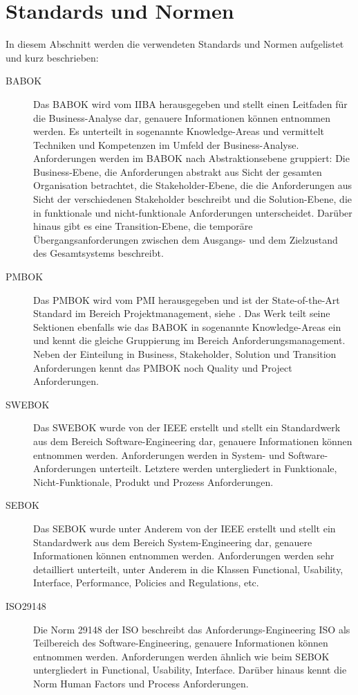 \section{Standards und Normen}
\label{sec:requirements:standards}
In diesem Abschnitt werden die verwendeten Standards und Normen aufgelistet und kurz beschrieben:
\begin{description}
  \item[BABOK] Das \ac{BABOK} wird vom \ac{IIBA} herausgegeben und stellt einen Leitfaden für die Business-Analyse dar, genauere Informationen können \cite{BABOK} entnommen werden. Es unterteilt in sogenannte Knowledge-Areas und vermittelt Techniken und Kompetenzen im Umfeld der Business-Analyse. Anforderungen werden im \ac{BABOK} nach Abstraktionsebene gruppiert: Die Business-Ebene, die Anforderungen abstrakt aus Sicht der gesamten Organisation betrachtet, die Stakeholder-Ebene, die die Anforderungen aus Sicht der verschiedenen Stakeholder beschreibt und die Solution-Ebene, die in funktionale und nicht-funktionale Anforderungen unterscheidet. Darüber hinaus gibt es eine Transition-Ebene, die temporäre Übergangsanforderungen zwischen dem Ausgangs- und dem Zielzustand des Gesamtsystems beschreibt.
  \item[PMBOK]  Das \ac{PMBOK} wird vom \ac{PMI} herausgegeben und ist der State-of-the-Art Standard im Bereich Projektmanagement, siehe \cite{PMBOK}. Das Werk teilt seine Sektionen ebenfalls wie das \ac{BABOK} in sogenannte Knowledge-Areas ein und kennt die gleiche Gruppierung im Bereich Anforderungsmanagement. Neben der Einteilung in Business, Stakeholder, Solution und Transition Anforderungen kennt das \ac{PMBOK} noch Quality und Project Anforderungen.
  \item[SWEBOK] Das \ac{SWEBOK} wurde von der \ac{IEEE} erstellt und stellt ein Standardwerk aus dem Bereich Software-Engineering dar, genauere Informationen können \cite{SWEBOK} entnommen werden. Anforderungen werden in System- und Software-Anforderungen unterteilt. Letztere werden untergliedert in Funktionale, Nicht-Funktionale, Produkt und Prozess Anforderungen.
  \item[SEBOK] Das \ac{SEBOK} wurde unter Anderem von der IEEE erstellt und stellt ein Standardwerk aus dem Bereich System-Engineering dar, genauere Informationen können \cite{SEBOK} entnommen werden. Anforderungen werden sehr detailliert unterteilt, unter Anderem in die Klassen Functional, Usability, Interface, Performance, Policies and Regulations, etc.
  \item[ISO29148] Die Norm 29148 der \ac{ISO} beschreibt das Anforderungs-Engineering \ac{ISO} als Teilbereich des Software-Engineering, genauere Informationen können \cite{ISO29148} entnommen werden. Anforderungen werden ähnlich wie beim \ac{SEBOK} untergliedert in Functional, Usability, Interface. Darüber hinaus kennt die Norm Human Factors und Process Anforderungen.

\end{description}

